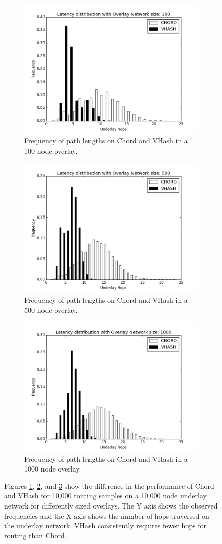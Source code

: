 \begin{figure}

\begin{subfigure}{\columnwidth}
\centering
	\includegraphics[width=0.5\linewidth]{figs/hist_100}
	\caption{Frequency of path lengths on Chord and VHash in a 100 node overlay.}
	\label{fig:hist100}
\end{subfigure}

\begin{subfigure}{\columnwidth}
	\centering
	\includegraphics[width=0.5\linewidth]{figs/hist_500}
	\caption{Frequency of path lengths on Chord and VHash in a 500 node overlay.}
	\label{fig:hist500}
\end{subfigure}

\begin{subfigure}{\columnwidth}
	\centering
	\includegraphics[width=0.5\linewidth]{figs/hist_1000}
	\caption{Frequency of path lengths on Chord and VHash in a 1000 node overlay.}
	\label{fig:hist1000}
\end{subfigure}

\caption{Figures \ref{fig:hist100}, \ref{fig:hist500}, and \ref{fig:hist1000} show the difference in the performance of Chord and VHash for 10,000 routing samples on a 10,000 node underlay network for differently sized overlays.
The Y axis shows the observed frequencies and the X axis shows the number of hops traversed on the underlay network.
VHash consistently requires fewer hops for routing than Chord.}
\label{fig:hist}

\end{figure}




